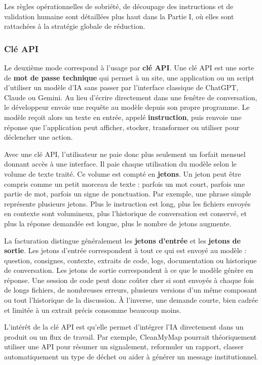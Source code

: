 \documentclass[
  10pt,
  a4paper,
  DIV=11,
  numbers=noendperiod,
  oneside]{scrreprt}
\let\oldtextbf\textbf
\renewcommand{\textbf}[1]{\oldtextbf{\textcolor{cmmnavy}{#1}}}
\begin{document}
Les règles opérationnelles de sobriété, de découpage des instructions et
de validation humaine sont détaillées plus haut dans la Partie I, où
elles sont rattachées à la stratégie globale de réduction.

\subsubsection{Clé API}\label{cluxe9-api}

Le deuxième mode correspond à l'usage par \textbf{clé API}. Une clé API
est une sorte de \textbf{mot de passe technique} qui permet à un site,
une application ou un script d'utiliser un modèle d'IA sans passer par
l'interface classique de ChatGPT, Claude ou Gemini. Au lieu d'écrire
directement dans une fenêtre de conversation, le développeur envoie une
requête au modèle depuis son propre programme. Le modèle reçoit alors un
texte en entrée, appelé \textbf{instruction}, puis renvoie une réponse
que l'application peut afficher, stocker, transformer ou utiliser pour
déclencher une action.

Avec une clé API, l'utilisateur ne paie donc plus seulement un forfait
mensuel donnant accès à une interface. Il paie chaque utilisation du
modèle selon le volume de texte traité. Ce volume est compté en
\textbf{jetons}. Un jeton peut être compris comme un petit morceau de
texte : parfois un mot court, parfois une partie de mot, parfois un
signe de ponctuation. Par exemple, une phrase simple représente
plusieurs jetons. Plus le instruction est long, plus les fichiers
envoyés en contexte sont volumineux, plus l'historique de conversation
est conservé, et plus la réponse demandée est longue, plus le nombre de
jetons augmente.

La facturation distingue généralement les \textbf{jetons d'entrée} et
les \textbf{jetons de sortie}. Les jetons d'entrée correspondent à tout
ce qui est envoyé au modèle : question, consignes, contexte, extraits de
code, logs, documentation ou historique de conversation. Les jetons de
sortie correspondent à ce que le modèle génère en réponse. Une session
de code peut donc coûter cher si sont envoyés à chaque fois de longs
fichiers, de nombreuses erreurs, plusieurs versions d'un même composant
ou tout l'historique de la discussion. À l'inverse, une demande courte,
bien cadrée et limitée à un extrait précis consomme beaucoup moins.

L'intérêt de la clé API est qu'elle permet d'intégrer l'IA directement
dans un produit ou un flux de travail. Par exemple, CleanMyMap pourrait
théoriquement utiliser une API pour résumer un signalement, reformuler
un rapport, classer automatiquement un type de déchet ou aider à générer
un message institutionnel.
\end{document}
